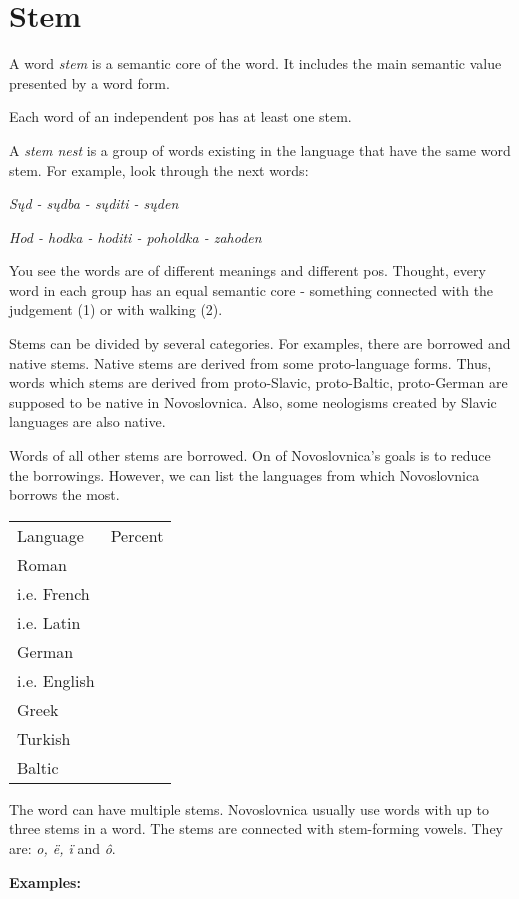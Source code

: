 \section{Stem}

A word \textit{stem} is a semantic core of the word. It includes the main semantic value presented by a word form.

Each word of an independent \gls{pos} has at least one stem.

A \textit{stem nest} is a group of words existing in the language that have the same word stem. For example, look through the next words:

\textit{Sųd - sųdba - sųditi - sųden}

\textit{Hod - hodka - hoditi - poholdka - zahoden}

You see the words are of different meanings and different \gls{pos}. Thought, every word in each group has an equal semantic core - something connected with the judgement (1) or with walking (2).

Stems can be divided by several categories. For examples, there are borrowed and native stems. Native stems are derived from some proto-language forms. Thus, words which stems are derived from proto-Slavic, proto-Baltic, proto-German are supposed to be native in Novoslovnica. Also, some neologisms created by Slavic languages are also native.

Words of all other stems are borrowed. On of Novoslovnica's goals is to reduce the borrowings. However, we can list the languages from which Novoslovnica borrows the most.

\begin{table}
	\begin{tabular}{ll}
		Language & Percent \\
		Roman & \\
		i.e. French & \\
		i.e. Latin & \\
		German & \\
		i.e. English & \\
		Greek & \\ 
		Turkish &  \\
		Baltic &  \\
	\end{tabular}
\end{table}

The word can have multiple stems. Novoslovnica usually use words with up to three stems in a word. The stems are connected with stem-forming vowels. They are: \textit{o, ë, ï} and \textit{ô}.

\textbf{Examples:}

